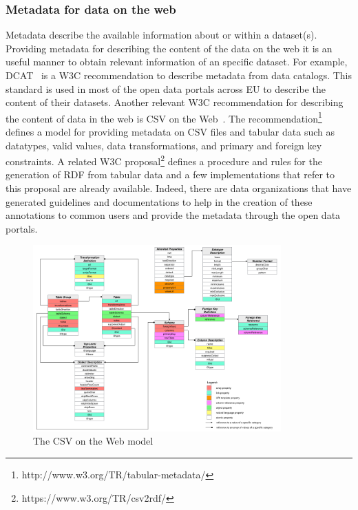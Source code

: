 \subsubsection{Metadata for data on the web}
Metadata describe the available information about or within a dataset(s). Providing metadata for describing the content of the data on the web it is an useful manner to obtain relevant information of an specific dataset. For example, DCAT~\citep{maali2018data} is a W3C recommendation to describe metadata from data catalogs. This standard is used in most of the open data portals across EU to describe the content of their datasets. Another relevant W3C recommendation for describing the content of data in the web is CSV on the Web~\citep{tennison2015model}.   
The recommendation\footnote{http://www.w3.org/TR/tabular-metadata/} defines a model for providing metadata on CSV files and tabular data such as datatypes, valid values, data transformations, and primary and foreign key constraints. A related W3C proposal\footnote{https://www.w3.org/TR/csv2rdf/} defines a procedure and rules for the generation of RDF from tabular data and a few implementations that refer to this proposal are already available. Indeed, there are data organizations that have generated guidelines and documentations to help in the creation of these annotations to common users and provide the metadata through the open data portals. 

\begin{figure}[!ht]
\centering
\includegraphics[width=0.85\textwidth]{figures/state-of-the-art/csvw-model.png}
\caption{The CSV on the Web model}
\label{fig:soa_csvw}
\end{figure}


